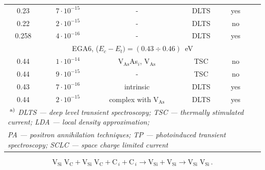 \documentclass[final,3p,times,twocolumn,authoryear]{elsarticle}
\begin{document}
\begin{table}
\begin{tabular}{cccccc}
0.23&$7\cdot10^{-15}$&-&DLTS&yes&\cite{Mircea1975}\\ %
0.22&$2\cdot10^{-15}$&-&DLTS&no&\cite{Fang:EL6}\\ %
0.258&$4\cdot10^{-16}$&-&DLTS&yes&\cite{Yousefi1995}\\ %
\multicolumn{6}{c}{EGA6, ($E_c-E_t)=(0.43\div0.46)$~eV}\\
0.44&$1\cdot10^{-14}$&V$_\mathrm{As}$As$_i$, V$_\mathrm{As}$&TSC&no&\cite{Pavlovic2000}\\ %
0.44&$9\cdot10^{-15}$&-&TSC&no&\cite{Pavlovic:GaAs}\\ %
\multirow{2}{*}{0.43}&\multirow{2}{*}{$7\cdot10^{-16}$}&\multirow{2}{*}{intrinsic}&\multirow{2}{*}{DLTS}&\multirow{2}{*}{yes}&\cite{Lefevre1977}\\
&&&&&\cite{Bourgoin:GaAs}\\
0.44&$2\cdot10^{-15}$&complex with V$_\mathrm{As}$&DLTS&yes&\cite{KolFTP1989En}\\ %
\multicolumn{6}{l}{$\textsuperscript{ a)}$ \emph{DLTS --- deep level transient spectroscopy;
TSC --- thermally stimulated current; LDA --- local density approximation;}}\\
\multicolumn{6}{l}{ \emph{PA --- positron annihilation techniques;
TP --- photoinduced transient spectroscopy;
SCLC --- space charge limited current}}\\
\hline
\end{tabular}
\end{table}

\cite{KolFTP1994En}

\cite{Samoilov1994En}

\cite{VaitkusEn}

\cite{KolFTP1989En}

\cite{Konakova2007JTFEn}

\cite{BoltovetsEn,Konakova2012FTPEn}

\cite{Bacherikov2003En,Pashkov1994En,BoltovetsEn,Milenin1994En,BelyaevIntac}

\begin{displaymath}
  \mathrm{V}_\mathrm{Si}\;\mathrm{V}_\mathrm{C}+\mathrm{V}_\mathrm{Si}\;\mathrm{V}_\mathrm{C}+\mathrm{C}_{\,i}+ \mathrm{C}_{\,i} \rightarrow \mathrm{V}_\mathrm{Si}+ \mathrm{V}_\mathrm{Si}\rightarrow \mathrm{V}_\mathrm{Si}\;\mathrm{V}_\mathrm{Si}\,.
\end{displaymath}
\end{document}
